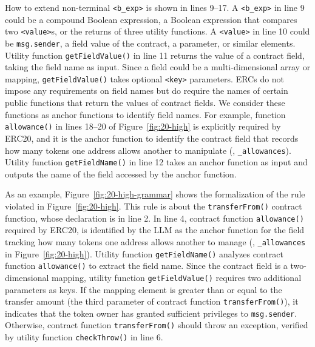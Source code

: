 How to extend non-terminal \texttt{<b\_exp>} is shown in lines 9--17. 
A \texttt{<b\_exp>} in line 9 could be a compound Boolean expression, 
a Boolean expression that compares two \texttt{<value>}s, 
or the returns of three utility functions. 
A \texttt{<value>} in line 10 could be
\texttt{msg.sender}, a field value of the contract, a parameter, or similar elements. 
Utility function \texttt{getFieldValue()} in line 11 returns the value of a contract field, taking 
the field name as input. 
Since a field could be a multi-dimensional array or mapping, 
\texttt{getFieldValue()} takes optional \texttt{<key>} parameters. 
ERCs do not impose any requirements on field names 
but do require the names of certain public functions that return the values of contract fields. 
We consider these functions as anchor functions to identify field names. For example,
function \texttt{allowance()} in lines 18--20 of Figure~\ref{fig:20-high} is explicitly required by ERC20, and it is the anchor function
to identify the contract field that records how many tokens
one address allows another to manipulate (\eg, \texttt{\_allowances}). 
Utility function \texttt{getFieldName()} in line 12 takes an anchor function as 
input and outputs the name of the field accessed by the anchor function. 




As an example, Figure~\ref{fig:20-high-grammar} shows 
the formalization of the rule violated in Figure~\ref{fig:20-high}. 
This rule is about the \texttt{transferFrom()} contract function, 
whose declaration is in line 2. 
In line 4, contract function \texttt{allowance()} required by ERC20, is identified by the LLM 
as the anchor function for the field tracking how many tokens one address allows another to manage (\eg, \texttt{\_allowances} in Figure~\ref{fig:20-high}). 
Utility function \texttt{getFieldName()} analyzes 
contract function \texttt{allowance()} 
to extract the field name. Since the contract field is a two-dimensional mapping, 
utility function \texttt{getFieldValue()} requires two additional parameters as keys. 
If the mapping element is greater than or equal to the 
transfer amount (the third parameter of contract function \texttt{transferFrom()}), 
it indicates that the token owner has granted sufficient privileges to 
\texttt{msg.sender}. Otherwise, contract function \texttt{transferFrom()} should throw an exception, verified by utility function \texttt{checkThrow()} in line 6.

